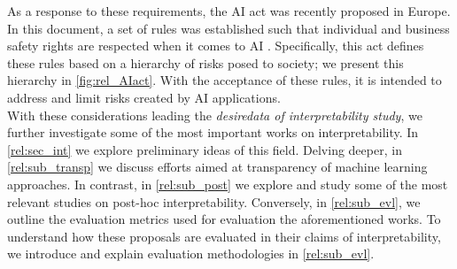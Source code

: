 \noindent As a response to these requirements, the AI act was recently proposed in Europe. In this 
document, a set of rules was established such that individual and business safety rights are 
respected when it comes to AI \autocite{madiega2021artificial}. Specifically, this act 
defines these rules based on a hierarchy of risks posed to society; we present this hierarchy in 
\autoref{fig:rel_AIact}. With the acceptance of these rules, it is intended to address and limit 
risks created by AI applications.\\



With these considerations leading the \emph{desiredata of interpretability study}, we further 
investigate some of the most important works on interpretability. In 
\autoref{rel:sec_int} we explore preliminary ideas of this field. Delving deeper, in 
\autoref{rel:sub_transp} we discuss efforts aimed at transparency of machine learning approaches. 
In contrast, in \autoref{rel:sub_post} we explore and study 
some of the most relevant studies on post-hoc interpretability. Conversely, in 
\autoref{rel:sub_evl}, we outline the evaluation metrics used for evaluation the aforementioned 
works. To understand how these proposals are evaluated in their claims of interpretability, we 
introduce and explain evaluation methodologies in \autoref{rel:sub_evl}.







